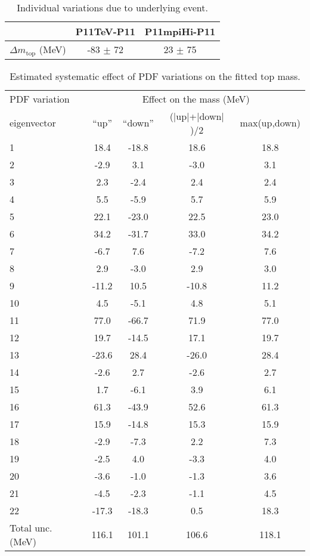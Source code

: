 \begin{table}[!htp]
\begin{center}
\begin{tabular}{l|c|c}
\hline\hline
        & P11TeV-P11  & P11mpiHi-P11\\
\hline
$\Delta m_{\textrm{top}}$ (MeV)      & -83 $\pm$ 72  & 23 $\pm$ 75 \\
\hline\hline
\end{tabular}
\caption{\label{tab:systematicsUE}Individual variations due to underlying event.}
\end{center}
\end{table}


\begin{table}[tb]
  \begin{center}
    \caption{Estimated systematic effect of PDF variations on the fitted top mass.\label{tab:pdfs}}
    \medskip
    \begin{tabular}{l|cccc}
      \hline\hline
      PDF variation              & \multicolumn{4}{c}{Effect on the mass (MeV) } \\ 
      \cline{2-5}
       eigenvector & ``up'' & ``down'' & ($|$up$|$+$|$down$|$)/2 & max(up,down) \\
      \hline\hline
		1 & 18.4 & -18.8 & 18.6 & 18.8 \\
		2 & -2.9 & 3.1 & -3.0 & 3.1 \\ 
		3 & 2.3 & -2.4 & 2.4 & 2.4 \\ 
		4 & 5.5 & -5.9 & 5.7 & 5.9 \\ 
		5 & 22.1 & -23.0 & 22.5 & 23.0 \\ 
		6 & 34.2 & -31.7 & 33.0 & 34.2 \\ 
		7 & -6.7 & 7.6 & -7.2 & 7.6 \\ 
		8 & 2.9 & -3.0 & 2.9 & 3.0 \\ 
		9 & -11.2 & 10.5 & -10.8 & 11.2 \\ 
		10 & 4.5 & -5.1 & 4.8 & 5.1 \\ 
		11 & 77.0 & -66.7 & 71.9 & 77.0 \\ 
		12 & 19.7 & -14.5 & 17.1 & 19.7 \\ 
		13 & -23.6 & 28.4 & -26.0 & 28.4 \\ 
		14 & -2.6 & 2.7 & -2.6 & 2.7 \\ 
		15 & 1.7 & -6.1 & 3.9 & 6.1 \\ 
		16 & 61.3 & -43.9 & 52.6 & 61.3 \\ 
		17 & 15.9 & -14.8 & 15.3 & 15.9 \\ 
		18 & -2.9 & -7.3 & 2.2 & 7.3 \\ 
		19 & -2.5 & 4.0 & -3.3 & 4.0 \\ 
		20 & -3.6 & -1.0 & -1.3 & 3.6 \\ 
		21 & -4.5 & -2.3 & -1.1 & 4.5 \\ 
		22 & -17.3 & -18.3 & 0.5 & 18.3 \\ 
      \hline
      \hline
      Total unc. (MeV)  & 116.1 & 101.1 & 106.6 & 118.1 \\
      \hline\hline
    \end{tabular}
  \end{center}
\end{table}  
